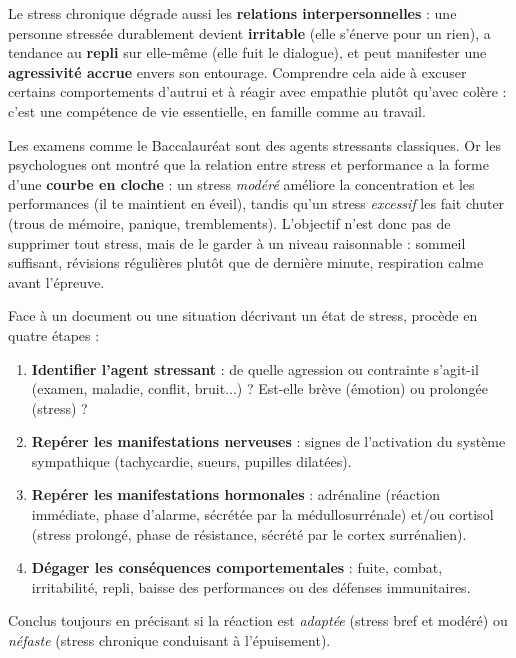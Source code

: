 \documentclass[11pt]{article}
\begin{document}
Le stress chronique dégrade aussi les \textbf{relations interpersonnelles} : une personne stressée durablement devient \textbf{irritable} (elle s'énerve pour un rien), a tendance au \textbf{repli} sur elle-même (elle fuit le dialogue), et peut manifester une \textbf{agressivité accrue} envers son entourage. Comprendre cela aide à excuser certains comportements d'autrui et à réagir avec empathie plutôt qu'avec colère : c'est une compétence de vie essentielle, en famille comme au travail.

\begin{savaistu}
Les examens comme le Baccalauréat sont des agents stressants classiques. Or les psychologues ont montré que la relation entre stress et performance a la forme d'une \textbf{courbe en cloche} : un stress \emph{modéré} améliore la concentration et les performances (il te maintient en éveil), tandis qu'un stress \emph{excessif} les fait chuter (trous de mémoire, panique, tremblements). L'objectif n'est donc pas de supprimer tout stress, mais de le garder à un niveau raisonnable : sommeil suffisant, révisions régulières plutôt que de dernière minute, respiration calme avant l'épreuve.
\end{savaistu}

\begin{methode}
Face à un document ou une situation décrivant un état de stress, procède en quatre étapes :
\begin{enumerate}
\item \textbf{Identifier l'agent stressant} : de quelle agression ou contrainte s'agit-il (examen, maladie, conflit, bruit...) ? Est-elle brève (émotion) ou prolongée (stress) ?
\item \textbf{Repérer les manifestations nerveuses} : signes de l'activation du système sympathique (tachycardie, sueurs, pupilles dilatées).
\item \textbf{Repérer les manifestations hormonales} : adrénaline (réaction immédiate, phase d'alarme, sécrétée par la médullosurrénale) et/ou cortisol (stress prolongé, phase de résistance, sécrété par le cortex surrénalien).
\item \textbf{Dégager les conséquences comportementales} : fuite, combat, irritabilité, repli, baisse des performances ou des défenses immunitaires.
\end{enumerate}
Conclus toujours en précisant si la réaction est \emph{adaptée} (stress bref et modéré) ou \emph{néfaste} (stress chronique conduisant à l'épuisement).
\end{methode}
\end{document}
